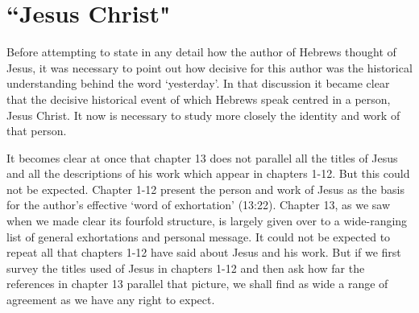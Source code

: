 \section{``Jesus Christ"}
Before attempting to state in any detail how the author of Hebrews thought of
Jesus, it was necessary to point out how decisive for this author was the
historical understanding behind the word `yesterday'.
In that discussion it became clear that the decisive historical event of which
Hebrews speak centred in a person, Jesus Christ.
It now is necessary to study more closely the identity and work of that person.
\newline

It becomes clear at once that chapter 13 does not parallel all the titles of
Jesus and all the descriptions of his work which appear in chapters 1-12.
But this could not be expected.
Chapter 1-12 present the person and work of Jesus as the basis for the author's
effective `word of exhortation' (13:22).
Chapter 13, as we saw when we made clear its fourfold structure, is largely
given over to a wide-ranging list of general exhortations and personal message.
It could not be expected to repeat all that chapters 1-12 have said about Jesus
and his work.
But if we first survey the titles used of Jesus in chapters 1-12 and then ask
how far the references in chapter 13 parallel that picture, we shall find as
wide a range of agreement as we have any right to expect.

